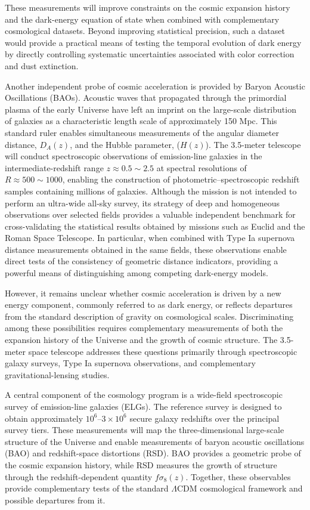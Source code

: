 These measurements will improve constraints on the cosmic expansion history and the dark-energy equation of state when combined with complementary cosmological datasets.
Beyond improving statistical precision, such a dataset would provide a practical means of testing the temporal evolution of dark energy by directly controlling systematic uncertainties associated with color correction and dust extinction.

Another independent probe of cosmic acceleration is provided by Baryon Acoustic Oscillations (BAOs). Acoustic waves that propagated through the primordial plasma of the early Universe have left an imprint on the large-scale distribution of galaxies as a characteristic length scale of approximately 150 Mpc. This standard ruler enables simultaneous measurements of the angular diameter distance, $D_A(z)$, and the Hubble parameter, ($H(z)$). The 3.5-meter telescope will conduct spectroscopic observations of emission-line galaxies in the intermediate-redshift range $z \approx 0.5 \sim 2.5$ at spectral resolutions of $R \approx 500 \sim 1000$, enabling the construction of photometric--spectroscopic redshift samples containing millions of galaxies. Although the mission is not intended to perform an ultra-wide all-sky survey, its strategy of deep and homogeneous observations over selected fields provides a valuable independent benchmark for cross-validating the statistical results obtained by missions such as Euclid and the Roman Space Telescope. In particular, when combined with Type Ia supernova distance measurements obtained in the same fields, these observations enable direct tests of the consistency of geometric distance indicators, providing a powerful means of distinguishing among competing dark-energy models.

However, it remains unclear whether cosmic acceleration is driven by a new energy component, commonly referred to as dark energy, or reflects departures from the standard description of gravity on cosmological scales. Discriminating among these possibilities requires complementary measurements of both the expansion history of the Universe and the growth of cosmic structure. The 3.5-meter space telescope addresses these questions primarily through spectroscopic galaxy surveys, Type Ia supernova observations, and complementary gravitational-lensing studies.

A central component of the cosmology program is a wide-field spectroscopic survey of emission-line galaxies (ELGs). The reference survey is designed to obtain approximately \(10^{6}\)--\(3\times10^{6}\) secure galaxy redshifts over the principal survey tiers. These measurements will map the three-dimensional large-scale structure of the Universe and enable measurements of baryon acoustic oscillations (BAO) and redshift-space distortions (RSD). BAO provides a geometric probe of the cosmic expansion history, while RSD measures the growth of structure through the redshift-dependent quantity \(f\sigma_{8}(z)\). Together, these observables provide complementary tests of the standard \(\Lambda\)CDM cosmological framework and possible departures from it.

